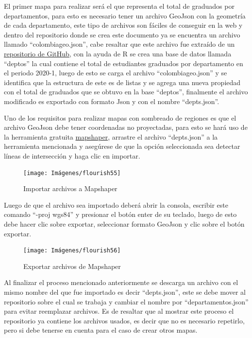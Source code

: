 \documentclass[
]{book}
\begin{document}
El primer mapa para realizar será el que representa el total de graduados por departamentos, para esto es necesario tener un archivo GeoJson con la geometría de cada departamento, este tipo de archivos son fáciles de conseguir en la web y dentro del repositorio donde se crea este documento ya se encuentra un archivo llamado ``colombiageo.json'', cabe resaltar que este archivo fue extraído de un \href{https://gist.github.com/john-guerra/43c7656821069d00dcbc}{repositorio de GitHub}, con la ayuda de R se crea una base de datos llamada ``deptos'' la cual contiene el total de estudiantes graduados por departamento en el periodo 2020-1, luego de esto se carga el archivo ``colombiageo.json'' y se identifica que la estructura de este es de listas y se agrega una nueva propiedad con el total de graduados que se obtuvo en la base ``deptos'', finalmente el archivo modificado es exportado con formato Json y con el nombre ``depts.json''.

Uno de los requisitos para realizar mapas con sombreado de regiones es que el archivo GeoJson debe tener coordenadas no proyectadas, para esto se hará uso de la herramienta gratuita \href{https://mapshaper.org/}{mapshaper}, arrastre el archivo ``depts.json'' a la herramienta mencionada y asegúrese de que la opción seleccionada sea detectar líneas de intersección y haga clic en importar.

\begin{figure}

{\centering \texttt{[image: Imágenes/flourish55]} 

}

\caption{Importar archivos a Mapshaper}\label{fig:importararchivosamapshaper-fig}
\end{figure}

Luego de que el archivo sea importado deberá abrir la consola, escribir este comando ``-proj wgs84'' y presionar el botón enter de su teclado, luego de esto debe hacer clic sobre exportar, seleccionar formato GeoJson y clic sobre el botón exportar.

\begin{figure}

{\centering \texttt{[image: Imágenes/flourish56]} 

}

\caption{Exportar archivos de Mapshaper}\label{fig:exportararchivosamapshaper-fig}
\end{figure}

Al finalizar el proceso mencionado anteriormente se descarga un archivo con el mismo nombre del que fue importado es decir ``depts.json'', este se debe mover al repositorio sobre el cual se trabaja y cambiar el nombre por ``departamentos.json'' para evitar reemplazar archivos. Es de resaltar que al mostrar este proceso el repositorio ya contiene los archivos usados, es decir que no es necesario repetirlo, pero si debe tenerse en cuenta para el caso de crear otros mapas.
\end{document}
